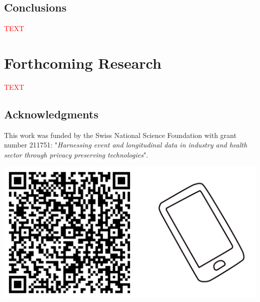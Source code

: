 \documentclass[a0,portrait]{a0poster}
\begin{document}
\begin{multicols}{3}
\begin{tcolorbox}[width=0.95\linewidth,colback={conclusion},frame empty,boxsep=1cm]
\section{Conclusions}

\textcolor{red}{TEXT} 

\end{tcolorbox}    

\section{Forthcoming Research}

\textcolor{red}{TEXT} 

\subsection{Acknowledgments}
\normalsize
This work was funded by the Swiss National Science Foundation with grant number 211751: "\textit{Harnessing event and longitudinal data in industry and health sector through privacy preserving technologies}".

\singlespacing
\small
\nocite{*} %

\includegraphics[width=1\linewidth]{Poster TEX/style/qr-code.png}
 
\end{multicols}
\end{document}
